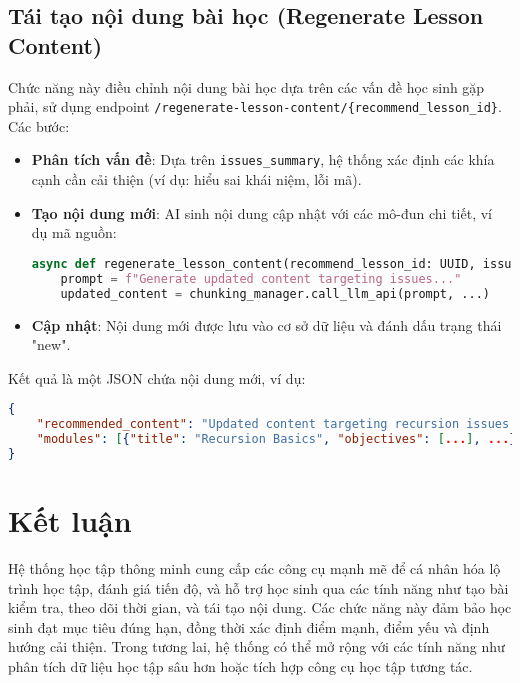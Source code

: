\subsection{Tái tạo nội dung bài học (Regenerate Lesson Content)}
Chức năng này điều chỉnh nội dung bài học dựa trên các vấn đề học sinh gặp phải, sử dụng endpoint \texttt{/regenerate-lesson-content/\{recommend\_lesson\_id\}}. Các bước:
\begin{itemize}
    \item \textbf{Phân tích vấn đề}: Dựa trên \texttt{issues\_summary}, hệ thống xác định các khía cạnh cần cải thiện (ví dụ: hiểu sai khái niệm, lỗi mã).
    \item \textbf{Tạo nội dung mới}: AI sinh nội dung cập nhật với các mô-đun chi tiết, ví dụ mã nguồn:
    \begin{lstlisting}[language=Python]
async def regenerate_lesson_content(recommend_lesson_id: UUID, issues_summary: dict, ...):
    prompt = f"Generate updated content targeting issues..."
    updated_content = chunking_manager.call_llm_api(prompt, ...)
    \end{lstlisting}
    \item \textbf{Cập nhật}: Nội dung mới được lưu vào cơ sở dữ liệu và đánh dấu trạng thái "new".
\end{itemize}
Kết quả là một JSON chứa nội dung mới, ví dụ:
\begin{lstlisting}[language=JSON]
{
    "recommended_content": "Updated content targeting recursion issues...",
    "modules": [{"title": "Recursion Basics", "objectives": [...], ...}]
}
\end{lstlisting}

\section{Kết luận}
Hệ thống học tập thông minh cung cấp các công cụ mạnh mẽ để cá nhân hóa lộ trình học tập, đánh giá tiến độ, và hỗ trợ học sinh qua các tính năng như tạo bài kiểm tra, theo dõi thời gian, và tái tạo nội dung. Các chức năng này đảm bảo học sinh đạt mục tiêu đúng hạn, đồng thời xác định điểm mạnh, điểm yếu và định hướng cải thiện. Trong tương lai, hệ thống có thể mở rộng với các tính năng như phân tích dữ liệu học tập sâu hơn hoặc tích hợp công cụ học tập tương tác.